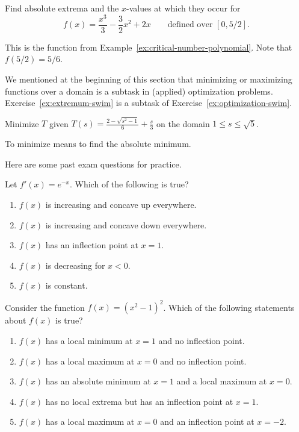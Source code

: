 \documentclass[../main.tex]{subfiles}
\begin{document}
\begin{exercise} \label{ex:closed-interval-method-intro}
  Find absolute extrema and the \(x\)-values at which they occur for
  \[
    f(x) = \frac{x^{3}}{3} - \frac{3}{2}x^{2} + 2x \qquad\text{defined over }[0,5/2].
  \]

  This is the function from Example~\ref{ex:critical-number-polynomial}. Note that \(f(5/2) = 5/6\).

\end{exercise}
\clearpage

We mentioned at the beginning of this section that minimizing or maximizing functions over a domain is a subtask in (applied) optimization problems. 
Exercise~\ref{ex:extremum-swim} is a subtask of Exercise~\ref{ex:optimization-swim}.
\begin{exercise} \label{ex:extremum-swim}
  Minimize \(T\) given \(T(s) = \frac{2 - \sqrt{s^{2} - 1}}{6} + \frac{s}{3}\) on the domain \(1 \le s \le \sqrt{5}\).

  To minimize means to find the absolute minimum.

\end{exercise}
\clearpage

Here are some past exam questions for practice. 

\begin{exercise}
  Let \(f'(x) = e^{-x}\). Which of the following is true?

  \begin{enumerate}[label={\Alph*.}, itemsep={1ex}]
    \item \(f(x)\) is increasing and concave up everywhere.
    \item \(f(x)\) is increasing and concave down everywhere.
    \item \(f(x)\) has an inflection point at \(x = 1\).
    \item \(f(x)\) is decreasing for \(x < 0\).
    \item \(f(x)\) is constant.
  \end{enumerate}

  \blanks*
\end{exercise}

\begin{exercise}
  Consider the function \(f(x) = (x^{2} - 1)^{2}\). Which of the following statements about \(f(x)\) is true?

  \begin{enumerate}[label={\Alph*.}, itemsep={1ex}]
    \item \(f(x)\) has a local minimum at \(x = 1\) and no inflection point.
    \item \(f(x)\) has a local maximum at \(x = 0\) and no inflection point.
    \item \(f(x)\) has an absolute minimum at \(x = 1\) and a local maximum at \(x = 0\).
    \item \(f(x)\) has no local extrema but has an inflection point at \(x = 1\).
    \item \(f(x)\) has a local maximum at \(x = 0\) and an inflection point at \(x = -2\).
  \end{enumerate}

  \blanks*
\end{exercise}
\end{document}
